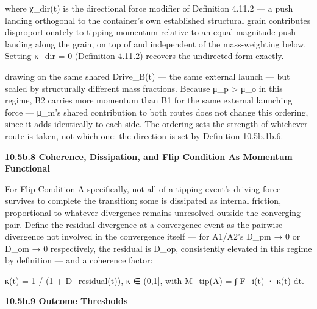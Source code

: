 \documentclass[
]{article}
\begin{document}
where χ\_dir(t) is the directional force modifier of Definition 4.11.2
--- a push landing orthogonal to the container's own established
structural grain contributes disproportionately to tipping momentum
relative to an equal-magnitude push landing along the grain, on top of
and independent of the mass-weighting below. Setting κ\_dir = 0
(Definition 4.11.2) recovers the undirected form exactly.

drawing on the same shared Drive\_B(t) --- the same external launch ---
but scaled by structurally different mass fractions. Because μ\_p
\textgreater{} μ\_o in this regime, B2 carries more momentum than B1 for
the same external launching force --- μ\_m's shared contribution to both
routes does not change this ordering, since it adds identically to each
side. The ordering sets the strength of whichever route is taken, not
which one: the direction is set by Definition 10.5b.1b.6.

\textbf{10.5b.8 Coherence, Dissipation, and Flip Condition As Momentum
Functional}

For Flip Condition A specifically, not all of a tipping event's driving
force survives to complete the transition; some is dissipated as
internal friction, proportional to whatever divergence remains
unresolved outside the converging pair. Define the residual divergence
at a convergence event as the pairwise divergence not involved in the
convergence itself --- for A1/A2's D\_pm → 0 or D\_om → 0 respectively,
the residual is D\_op, consistently elevated in this regime by
definition --- and a coherence factor:

κ(t) = 1 / (1 + D\_residual(t)), κ ∈ (0,1{]}, with M\_tip(A) = ∫ F\_i(t)
· κ(t) dt.

\textbf{10.5b.9 Outcome Thresholds}
\end{document}
